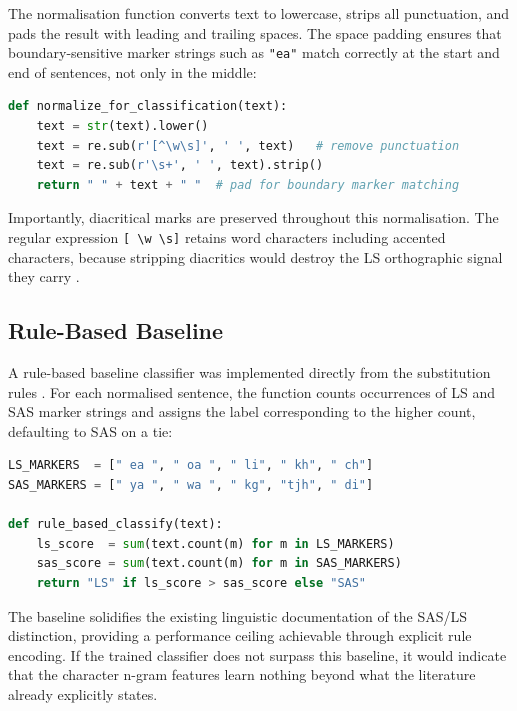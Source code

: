 \documentclass[11pt,a4paper]{article}
\begin{document}
The normalisation function converts text to lowercase, strips all punctuation, and pads the result with leading and trailing spaces. The space padding ensures that boundary-sensitive marker strings such as \texttt{"ea"} match correctly at the start and end of sentences, not only in the middle:

\begin{lstlisting}[language=Python, caption={Pre-classification normalisation.}, label={lst:norm}]
def normalize_for_classification(text):
    text = str(text).lower()
    text = re.sub(r'[^\w\s]', ' ', text)   # remove punctuation
    text = re.sub(r'\s+', ' ', text).strip()
    return " " + text + " "  # pad for boundary marker matching
\end{lstlisting}

Importantly, diacritical marks are preserved throughout this normalisation. The regular expression \texttt{[~\textbackslash w \textbackslash s]} retains word characters including accented characters, because stripping diacritics would destroy the LS orthographic signal they carry \citep{matlosa2017sesotho}.

\subsection{Rule-Based Baseline}

A rule-based baseline classifier was implemented directly from the substitution rules \citet{makutoane2022people}. For each normalised sentence, the function counts occurrences of LS and SAS marker strings and assigns the label corresponding to the higher count, defaulting to SAS on a tie:

\begin{lstlisting}[language=Python, caption={Rule-based baseline classifier.}, label={lst:rulebased}]
LS_MARKERS  = [" ea ", " oa ", " li", " kh", " ch"]
SAS_MARKERS = [" ya ", " wa ", " kg", "tjh", " di"]
 
def rule_based_classify(text):
    ls_score  = sum(text.count(m) for m in LS_MARKERS)
    sas_score = sum(text.count(m) for m in SAS_MARKERS)
    return "LS" if ls_score > sas_score else "SAS"
\end{lstlisting}

The baseline solidifies the existing linguistic documentation of the SAS/LS distinction, providing a performance ceiling achievable through explicit rule encoding. If the trained classifier does not surpass this baseline, it would indicate that the character n-gram features learn nothing beyond what the literature already explicitly states.
\end{document}
